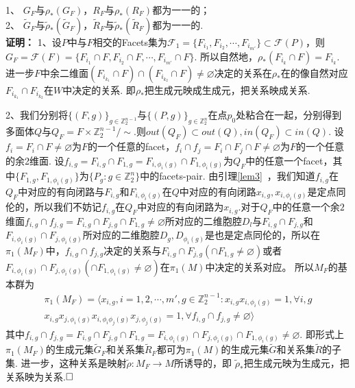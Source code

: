 \documentclass{article}
\theoremstyle{plain}%
\theoremstyle{definition}
\theoremstyle{remark}
\begin{document}
{\lem \label{lemm}1、 $G_F$与$\rho_{*}(G_F)$，$R_F$与$\rho_{*}(R_F)$都为一一的；\\
2、
$\widetilde{G}_F$与$\widetilde{\rho}_*(\widetilde{G}_F)$，$\widetilde{R}_F$与$\widetilde{\rho}_*(\widetilde{R}_F)$都为一一的.
}\\
{\bf 证明：}
1、设$P$中与$F$相交的Facets集为$\mathcal{F}_1=\{F_{i_1},F_{i_2},\cdots,F_{i_{m'}}\}\subset \mathcal{F}(P)$，则$G_F=\mathcal{F}(F)=\{F_{i_1}\cap F,F_{i_2}\cap F,\cdots,F_{i_{m'}}\cap F\}$. 所以自然地，$\rho_{*}(F_{i_k}\cap F)=F_{i_k}$. 进一步$F$中余二维面$(F_{i_{k_1}}\cap F)\cap (F_{i_{k_2}}\cap F)\neq\varnothing$决定的关系在$\rho_{*}$在的像自然对应$F_{i_{k_1}}\cap F_{i_{k_2}}$在$W$中决定的关系. 
即$\rho_{*}$把生成元映成生成元，把关系映成关系.

\begin{figure}[h]
\centering
\def\svgwidth{0.5\textwidth}

\end{figure}
2、我们分别将$\{(F,g)\}_{g\in \mathbb{Z}_2^{n-1}}$与$\{(P,g)\}_{g\in \mathbb{Z}_2^{n}}$在点$p_0$处粘合在一起，分别得到多面体$Q$与$Q_F=F\times \mathbb{Z}_2^{n-1}/\sim$.则$out(Q_F)\subset out(Q),in(Q_F)\subset in(Q)$. 设$f_{i}=F_i\cap F\neq \varnothing$为$F$的一个任意的facet，$f_i\cap f_j=F_i\cap F_j\cap F\neq \varnothing$为$F$的一个任意的余2维面. 设$f_{i,g}=F_{i,g}\cap F_{1,g}=F_{i,\phi_i(g)}\cap F_{1,\phi_i(g)}$为$Q_F$中的任意一个facet，其中$\{F_{1,g},F_{1,\phi_i(g)}\}$为$\{P_g: g\in \mathbb{Z}_2^n\}$中的facets-pair. 由引理\ref{lem3}~，我们知道$f_{i,g}$在$Q_F$中对应的有向闭路与$F_{i,g}$和$F_{i,\phi_i(g)}$在$Q$中对应的有向闭路$x_{i,g},x_{i,\phi_i(g)}$是定点同伦的，所以我们不妨记$f_{i,g}$在$Q_F$中对应的有向闭路为$x_{i,g}$.对于$Q_F$中的任意一个余$2$维面$f_{i,g}\cap f_{j,g}=F_{i,g}\cap F_{j,g}\cap F_{1,g}\neq\varnothing$所对应的二维胞腔$D_l$与$F_{i,g}\cap F_{j,g}$和$F_{i,\phi_i(g)}\cap F_{j,\phi_i(g)}$所对应的二维胞腔$D_{g},D_{\phi_i(g)}$是也是定点同伦的，所以在$\pi_1(M_F)$中，$f_{i,g}\cap f_{j,g}$决定的关系与$F_{i,g}\cap F_{j,g}(\cap F_{1,g}\neq \varnothing)$或者$F_{i,\phi_i(g)}\cap F_{j,\phi_i(g)}(\cap F_{1,\phi_i(g)}\neq \varnothing)$在$\pi_1(M)$中决定的关系对应。
所以$M_F$的基本群为
\begin{multline}
\pi_1(M_F)=\langle x_{i,g},i=1,2,\cdots,m',g\in \mathbb{Z}_2^{n-1}:x_{i,g}x_{i,\phi_i(g)}=1,\forall i,g\\
x_{i,g}x_{j,\phi_i(g)}x_{i,\phi_i\phi_j(g)}x_{j,\phi_j(g)}=1,\forall f_{i,g}\cap f_{j,g}\neq \varnothing\rangle
\end{multline}
其中$f_{i,g}\cap f_{j,g}=F_{i,g}\cap F_{j,g}\cap F_{1,g}=F_{i,\phi_i(g)}\cap F_{j,\phi_i(g)}\cap F_{1,\phi_i(g)}\neq \varnothing$.
即形式上$\pi_1(M_F)$的生成元集$\widetilde{G}_F$和关系集$\widetilde{R}_F$都可为$\pi_1(M)$的生成元集$\widetilde{G}$和关系集$\widetilde{R}$的子集. 进一步，这种关系是映射$\widetilde{\rho}:M_F\longrightarrow M$所诱导的，即
$\widetilde{\rho}_{*}$把生成元映为生成元，把关系映为关系.$\hfill{} \Box$
\end{document}
